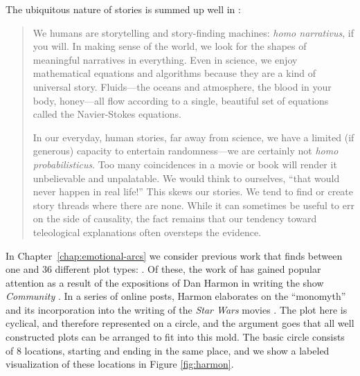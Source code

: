 {The ubiquitous nature of stories is summed up well in \cite{dodds2013homo}:
\begin{quote}
We humans are storytelling and story-finding machines: \textit{homo narrativus}, if you will.
In making sense of the world, we look for the shapes of meaningful narratives in everything.
Even in science, we enjoy mathematical equations and algorithms because they are a kind of universal story.
Fluids---the oceans and atmosphere, the blood in your body, honey---all flow according to a single, beautiful set of equations called the Navier-Stokes equations.

In our everyday, human stories, far away from science, we have a limited (if generous) capacity to entertain randomness---we are certainly not \textit{homo probabilisticus}.
Too many coincidences in a movie or book will render it unbelievable and unpalatable.
We would think to ourselves, ``that would never happen in real life!''
This skews our stories. We tend to find or create story threads where there are none.
While it can sometimes be useful to err on the side of causality, the fact remains that our tendency toward teleological explanations often oversteps the evidence.
\end{quote}



In Chapter~\ref{chap:emotional-arcs} we consider previous work that finds between one and 36 different plot types: \cite{campbell1949hero,harris1959basic,abbott2008cambridge,booker2006seven,polti1921thirty}.
Of these, the work of \cite{campbell1991a} has gained popular attention as a result of the expositions of Dan Harmon in writing the show \textit{Community} \citep{raftery2011harmon}.
In a series of online posts, Harmon elaborates on the ``monomyth'' and its incorporation into the writing of the \textit{Star Wars} movies \citep{volger1992writer}.
The plot here is cyclical, and therefore represented on a circle, and the argument goes that all well constructed plots can be arranged to fit into this mold.
The basic circle consists of 8 locations, starting and ending in the same place, and we show a labeled visualization of these locations in Figure \ref{fig:harmon}.


}
